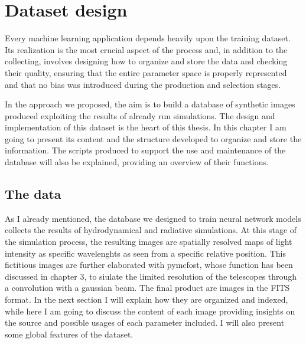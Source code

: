 \documentclass[a4paper,10pt]{report}
\begin{document}
\chapter{Dataset design}

Every machine learning application depends heavily upon the training dataset. 
Its realization is the most crucial aspect of the process and, in addition to the collecting,
involves designing how to organize and store the data and checking their quality, 
ensuring that the entire parameter space is properly represented and that no bias was introduced during
the production and selection stages.

In the approach we proposed, the aim is to build a database of synthetic images produced exploiting 
the results of already run simulations. The design and implementation of this dataset is the heart of this
thesis. In this chapter I am going to present its content and the structure developed to organize and store the information. 
The scripts produced to support the use and maintenance of the database will also be explained, 
providing an overview of their functions.

\section{The data}

As I already mentioned, the database we designed to train neural network models collects the results
of hydrodynamical and radiative simulations. At this stage of the simulation process, the resulting images
are spatially resolved maps of light intensity as specific wavelenghts as seen from a specific relative position.
This fictitious images are further elaborated with pymcfost, whose function has been discussed in chapter 3, to siulate the limited resolution of
the telescopes through a convolution with a gaussian beam.
The final product are images in the FITS format. In the next section I will explain how they are organized
and indexed, while here I am going to discuss the content of each image providing insights on the source and
possible usages of each parameter included. I will also present some global features of the dataset.
\end{document}
